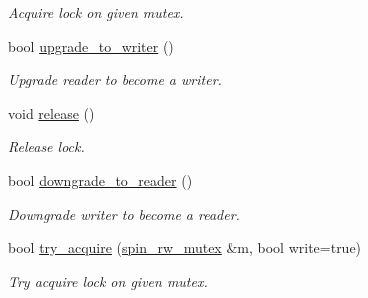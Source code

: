 \begin{DoxyCompactItemize}
\begin{DoxyCompactList}\small\item\em Acquire lock on given mutex. \end{DoxyCompactList}\item 
bool \hyperlink{classtbb_1_1spin__rw__mutex__v3_1_1scoped__lock_afbe5de57eadc457518df7a1bb0d30c00}{upgrade\+\_\+to\+\_\+writer} ()
\begin{DoxyCompactList}\small\item\em Upgrade reader to become a writer. \end{DoxyCompactList}\item 
\hypertarget{classtbb_1_1spin__rw__mutex__v3_1_1scoped__lock_a99e279a995a51abfb87b865e886949f8}{}void \hyperlink{classtbb_1_1spin__rw__mutex__v3_1_1scoped__lock_a99e279a995a51abfb87b865e886949f8}{release} ()\label{classtbb_1_1spin__rw__mutex__v3_1_1scoped__lock_a99e279a995a51abfb87b865e886949f8}

\begin{DoxyCompactList}\small\item\em Release lock. \end{DoxyCompactList}\item 
\hypertarget{classtbb_1_1spin__rw__mutex__v3_1_1scoped__lock_aa693c05221d977856a98270a255fe5df}{}bool \hyperlink{classtbb_1_1spin__rw__mutex__v3_1_1scoped__lock_aa693c05221d977856a98270a255fe5df}{downgrade\+\_\+to\+\_\+reader} ()\label{classtbb_1_1spin__rw__mutex__v3_1_1scoped__lock_aa693c05221d977856a98270a255fe5df}

\begin{DoxyCompactList}\small\item\em Downgrade writer to become a reader. \end{DoxyCompactList}\item 
\hypertarget{classtbb_1_1spin__rw__mutex__v3_1_1scoped__lock_abf17ada91882fd70f139c503c0220f16}{}bool \hyperlink{classtbb_1_1spin__rw__mutex__v3_1_1scoped__lock_abf17ada91882fd70f139c503c0220f16}{try\+\_\+acquire} (\hyperlink{classtbb_1_1spin__rw__mutex}{spin\+\_\+rw\+\_\+mutex} \&m, bool write=true)\label{classtbb_1_1spin__rw__mutex__v3_1_1scoped__lock_abf17ada91882fd70f139c503c0220f16}

\begin{DoxyCompactList}\small\item\em Try acquire lock on given mutex. \end{DoxyCompactList}\end{DoxyCompactItemize}
